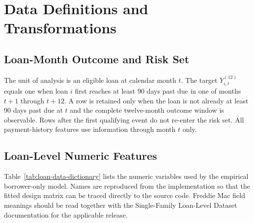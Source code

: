 \chapter{Data Definitions and Transformations}
\label{app:data-dictionary}

\section{Loan-Month Outcome and Risk Set}

The unit of analysis is an eligible loan at calendar month $t$. The target $Y_{i,t}^{(12)}$ equals one when loan $i$ first reaches at least 90 days past due in one of months $t+1$ through $t+12$. A row is retained only when the loan is not already at least 90 days past due at $t$ and the complete twelve-month outcome window is observable. Rows after the first qualifying event do not re-enter the risk set. All payment-history features use information through month $t$ only.

\section{Loan-Level Numeric Features}

Table~\ref{tab:loan-data-dictionary} lists the numeric variables used by the empirical borrower-only model. Names are reproduced from the implementation so that the fitted design matrix can be traced directly to the source code. Freddie Mac field meanings should be read together with the Single-Family Loan-Level Dataset documentation for the applicable release.

